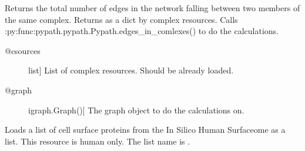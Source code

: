 \documentclass[letterpaper,10pt,english]{sphinxmanual}
\begin{document}
\begin{fulllineitems}
\begin{fulllineitems}
\label{\detokenize{reference:pypath.main.PyPath.sum_in_complex}}
Returns the total number of edges in the network falling
between two members of the same complex.
Returns as a dict by complex resources.
Calls :py:func:pypath.pypath.Pypath.edges\_in\_comlexes()
to do the calculations.
\begin{description}
\item[{@csources}] \leavevmode{[}list{]}
List of complex resources. Should be already loaded.

\item[{@graph}] \leavevmode{[}igraph.Graph(){]}
The graph object to do the calculations on.

\end{description}

\end{fulllineitems}


\begin{fulllineitems}
\label{\detokenize{reference:pypath.main.PyPath.surfaceome_list}}
Loads a list of cell surface proteins from the In Silico Human
Surfaceome as a list. This resource is human only.
The list name is .

\end{fulllineitems}


\begin{fulllineitems}
\label{\detokenize{reference:pypath.main.PyPath.table_latex}}
\end{fulllineitems}



\end{fulllineitems}
\end{document}
